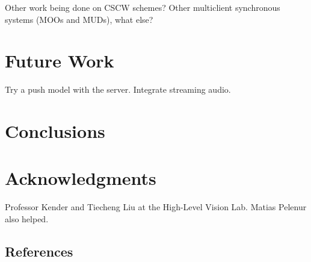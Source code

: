 \documentclass{sig-alternate}
\begin{document}
Other work being done on CSCW schemes?  Other multiclient synchronous 
systems (MOOs and MUDs), what else?

\section{Future Work} \label{con}

Try a push model with the server.  Integrate streaming audio.

\section{Conclusions}

\section{Acknowledgments}

Professor Kender and Tiecheng Liu at the High-Level Vision Lab.
Matias Pelenur also helped.

%


%

\subsection{References}


\balancecolumns %
\end{document}
